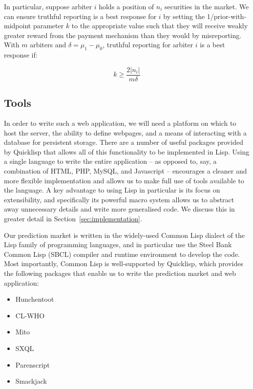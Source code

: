 In particular, suppose arbiter $i$ holds a position of $n_i$ securities in the
market. We can ensure truthful reporting is a best response for $i$ by setting
the 1/prior-with-midpoint parameter $k$ to the appropriate value such that they
will receive weakly greater reward from the payment mechanism than they would
by misreporting. With $m$ arbiters and $\delta = \mu_1 - \mu_0$, truthful
reporting for arbiter $i$ is a best response if:

\begin{equation}
	\label{eq:kParameter}
	k \ge \frac{2 |n_i|}{m \delta}
\end{equation}

\subsection{Tools}

In order to write such a web application, we will need a platform on which to
host the server, the ability to define webpages, and a means of interacting
with a database for persistent storage. There are a number of useful packages
provided by Quicklisp that allows all of this functionality to be implemented
in Lisp. Using a single language to write the entire application -- as opposed
to, say, a combination of HTML, PHP, MySQL, and Javascript -- encourages a
cleaner and more flexible implementation and allows us to make full use of
tools available to the language. A key advantage to using Lisp in particular is
its focus on extensibility, and specifically its powerful macro system allows
us to abstract away unnecessary details and write more generalised code. We
discuss this in greater detail in Section~\ref{sec:implementation}.

Our prediction market is written in the widely-used Common Lisp dialect of the
Lisp family of programming languages, and in particular use the Steel Bank
Common Lisp (SBCL) compiler and runtime environment to develop the code. Most
importantly, Common Lisp is well-supported by Quicklisp, which provides the
following packages that enable us to write the prediction market and web
application:

\begin{itemize}
	\item Hunchentoot \cite{Hunchentoot}
	\item CL-WHO \cite{CL-WHO}
	\item Mito \cite{Mito}
	\item SXQL \cite{SXQL}
	\item Parenscript \cite{Parenscript}
	\item Smackjack \cite{Smackjack}
\end{itemize}

